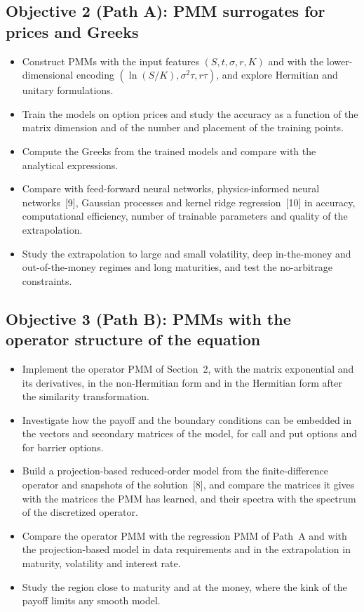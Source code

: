 \documentclass[12pt,a4paper]{article}
\begin{document}
\subsection*{Objective 2 (Path A): PMM surrogates for prices and Greeks}
\begin{itemize}
    \item Construct PMMs with the input features $(S,t,\sigma,r,K)$
    and with the lower-dimensional encoding
    $(\ln(S/K),\sigma^2\tau,r\tau)$, and explore Hermitian and unitary
    formulations.
    \item Train the models on option prices and study the accuracy as
    a function of the matrix dimension and of the number and placement
    of the training points.
    \item Compute the Greeks from the trained models and compare with
    the analytical expressions.
    \item Compare with feed-forward neural networks, physics-informed
    neural networks~[9], Gaussian processes and kernel ridge
    regression~[10] in accuracy, computational efficiency, number of
    trainable parameters and quality of the extrapolation.
    \item Study the extrapolation to large and small volatility, deep
    in-the-money and out-of-the-money regimes and long maturities,
    and test the no-arbitrage constraints.
\end{itemize}

\subsection*{Objective 3 (Path B): PMMs with the operator structure of the equation}
\begin{itemize}
    \item Implement the operator PMM of Section~2, with the matrix
    exponential and its derivatives, in the non-Hermitian form and in
    the Hermitian form after the similarity transformation.
    \item Investigate how the payoff and the boundary conditions can
    be embedded in the vectors and secondary matrices of the model,
    for call and put options and for barrier options.
    \item Build a projection-based reduced-order model from the
    finite-difference operator and snapshots of the solution~[8], and
    compare the matrices it gives with the matrices the PMM has
    learned, and their spectra with the spectrum of the discretized
    operator.
    \item Compare the operator PMM with the regression PMM of Path~A
    and with the projection-based model in data requirements and in
    the extrapolation in maturity, volatility and interest rate.
    \item Study the region close to maturity and at the money, where
    the kink of the payoff limits any smooth model.
\end{itemize}
\end{document}
